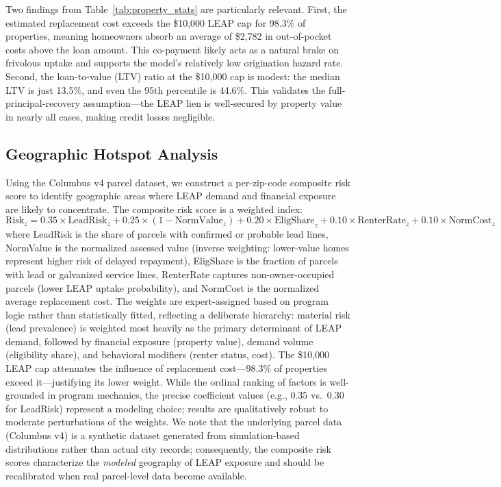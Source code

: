 \documentclass[11pt, letterpaper]{article}
\begin{document}
Two findings from Table~\ref{tab:property_stats} are particularly relevant. First, the estimated replacement cost exceeds the \$10{,}000 LEAP cap for 98.3\% of properties, meaning homeowners absorb an average of \$2{,}782 in out-of-pocket costs above the loan amount. This co-payment likely acts as a natural brake on frivolous uptake and supports the model's relatively low origination hazard rate. Second, the loan-to-value (LTV) ratio at the \$10{,}000 cap is modest: the median LTV is just 13.5\%, and even the 95th percentile is 44.6\%. This validates the full-principal-recovery assumption---the LEAP lien is well-secured by property value in nearly all cases, making credit losses negligible.

\subsection{Geographic Hotspot Analysis}

Using the Columbus v4 parcel dataset, we construct a per-zip-code composite risk score to identify geographic areas where LEAP demand and financial exposure are likely to concentrate. The composite risk score is a weighted index:
\begin{equation}
  \text{Risk}_z = 0.35 \times \text{LeadRisk}_z + 0.25 \times (1 - \text{NormValue}_z) + 0.20 \times \text{EligShare}_z + 0.10 \times \text{RenterRate}_z + 0.10 \times \text{NormCost}_z
\end{equation}
where LeadRisk is the share of parcels with confirmed or probable lead lines, NormValue is the normalized assessed value (inverse weighting: lower-value homes represent higher risk of delayed repayment), EligShare is the fraction of parcels with lead or galvanized service lines, RenterRate captures non-owner-occupied parcels (lower LEAP uptake probability), and NormCost is the normalized average replacement cost. The weights are expert-assigned based on program logic rather than statistically fitted, reflecting a deliberate hierarchy: material risk (lead prevalence) is weighted most heavily as the primary determinant of LEAP demand, followed by financial exposure (property value), demand volume (eligibility share), and behavioral modifiers (renter status, cost). The \$10{,}000 LEAP cap attenuates the influence of replacement cost---98.3\% of properties exceed it---justifying its lower weight. While the ordinal ranking of factors is well-grounded in program mechanics, the precise coefficient values (e.g., 0.35 vs.\ 0.30 for LeadRisk) represent a modeling choice; results are qualitatively robust to moderate perturbations of the weights. We note that the underlying parcel data (Columbus v4) is a synthetic dataset generated from simulation-based distributions rather than actual city records; consequently, the composite risk scores characterize the \emph{modeled} geography of LEAP exposure and should be recalibrated when real parcel-level data become available.
\end{document}
